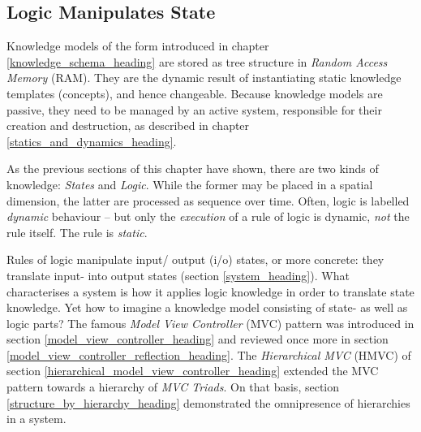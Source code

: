 %
%
%
%
%
%
%

\subsection{Logic Manipulates State}
\label{logic_manipulates_state_heading}

Knowledge models of the form introduced in chapter \ref{knowledge_schema_heading}
are stored as tree structure in \emph{Random Access Memory} (RAM). They are the
dynamic result of instantiating static knowledge templates (concepts), and hence
changeable. Because knowledge models are passive, they need to be managed by an
active system, responsible for their creation and destruction, as described in
chapter \ref{statics_and_dynamics_heading}.

As the previous sections of this chapter have shown, there are two kinds of
knowledge: \emph{States} and \emph{Logic}. While the former may be placed in a
spatial dimension, the latter are processed as sequence over time. Often, logic
is labelled \emph{dynamic} behaviour -- but only the \emph{execution} of a rule
of logic is dynamic, \emph{not} the rule itself. The rule is \emph{static}.

Rules of logic manipulate input/ output (i/o) states, or more concrete: they
translate input- into output states (section \ref{system_heading}). What
characterises a system is how it applies logic knowledge in order to translate
state knowledge. Yet how to imagine a knowledge model consisting of state- as
well as logic parts? The famous \emph{Model View Controller} (MVC) pattern was
introduced in section \ref{model_view_controller_heading} and reviewed once
more in section \ref{model_view_controller_reflection_heading}. The
\emph{Hierarchical MVC} (HMVC) of section
\ref{hierarchical_model_view_controller_heading} extended the MVC pattern
towards a hierarchy of \emph{MVC Triads}. On that basis, section
\ref{structure_by_hierarchy_heading} demonstrated the omnipresence of
hierarchies in a system.

